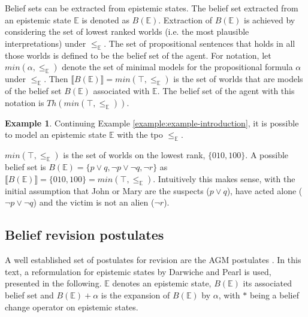 \documentclass[english, 12pt]{scrartcl}
\theoremstyle{definition}
\newtheorem{example}{Example}
\theoremstyle{definition}
\theoremstyle{definition}
\newcommand{\modelsOf}[1]{\llbracket #1 \rrbracket}
\begin{document}
Belief sets can be extracted from epistemic states. The belief set extracted from an epistemic state $\mathbb{E}$ is denoted as $B(\mathbb{E})$. Extraction of $B(\mathbb{E})$ is achieved by considering the set of lowest ranked worlds (i.e. the most plausible interpretations) under $\leq_{\mathbb{E}}$. The set of propositional sentences that holds in all those worlds is defined to be the belief set of the agent. For notation, let $min(\alpha, \leq_{\mathbb{E}})$ denote the set of minimal models for the propositional formula $\alpha$ under $\leq_{\mathbb{E}}$. Then $\modelsOf{B(\mathbb{E})} = min(\top, \leq_{\mathbb{E}})$ is the set of worlds that are models of the belief set $B(\mathbb{E})$ associated with $\mathbb{E}$. The belief set of the agent with this notation is $Th(min(\top, \leq_{\mathbb{E}}))$.

\begin{example}
    Continuing Example \ref{example:example-introduction}, it is possible to model an epistemic state $\mathbb{E}$ with the tpo $\leq_{\mathbb{E}}$.
    
    $min(\top, \leq_{\mathbb{E}})$ is the set of worlds on the lowest rank, $\{010, 100\}$. A possible belief set is $B(\mathbb{E}) = \{p \vee q, \neg p \vee \neg q, \neg r\}$ as $\modelsOf{B(\mathbb{E})} = \{010, 100\} = min(\top, \leq_{\mathbb{E}})$. Intuitively this makes sense, with the initial assumption that John or Mary are the suspects ($p \vee q$), have acted alone ($\neg p \vee \neg q$) and the victim is not an alien ($\neg r$).
\end{example}

\subsection{Belief revision postulates}
\label{chapter:dp-agm-postulates}
A well established set of postulates for revision are the AGM postulates \cite{Alchourron1985}. In this text, a reformulation for epistemic states by Darwiche and Pearl \cite{Darwiche1997} is used, presented in the following. $\mathbb{E}$ denotes an epistemic state, $B(\mathbb{E})$ its associated belief set and $B(\mathbb{E}) + \alpha$ is the expansion of $B(\mathbb{E})$ by $\alpha$, with $\ast$ being a belief change operator on epistemic states. 
\end{document}
